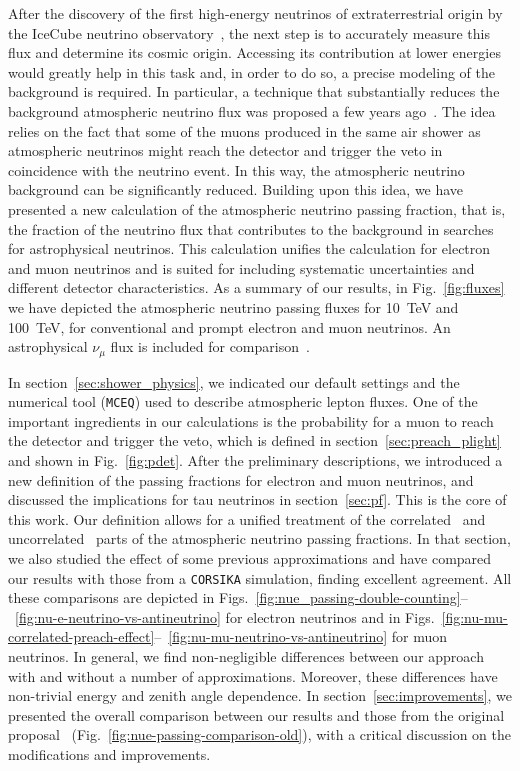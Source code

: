 \documentclass[aps,prd,showpacs,letterpaper,onecolumn,longbibliography,superscriptaddress,notitlepage,nofootinbib]{revtex4-1}%
\newcommand{\MCEq}{\texttt{MCE{\scriptsize Q}}}
\newcommand{\CORSIKA}{\texttt{CORSIKA}}
\begin{document}
After the discovery of the first high-energy neutrinos of extraterrestrial origin by the IceCube neutrino observatory~\cite{Aartsen:2013bka, Aartsen:2013jdh, Aartsen:2014gkd, Aartsen:2015zva, Aartsen:2017mau, Aartsen:2015rwa, Aartsen:2016xlq, Aartsen:2014muf}, the next step is to accurately measure this flux and determine its cosmic origin. Accessing its contribution at lower energies would greatly help in this task and, in order to do so, a precise modeling of the background is required. In particular, a technique that substantially reduces the background atmospheric neutrino flux was proposed a few years ago~\cite{Schonert:2008is, Gaisser:2014bja}. The idea relies on the fact that some of the muons produced in the same air shower as atmospheric neutrinos might reach the detector and trigger the veto in coincidence with the neutrino event. In this way, the atmospheric neutrino background can be significantly reduced. Building upon this idea, we have presented a new calculation of the atmospheric neutrino passing fraction, that is, the fraction of the neutrino flux that contributes to the background in searches for astrophysical neutrinos. This calculation unifies the calculation for electron and muon neutrinos and is suited for including systematic uncertainties and different detector characteristics. As a summary of our results, in Fig.~\ref{fig:fluxes} we have depicted the atmospheric neutrino passing fluxes for 10~TeV and 100~TeV, for conventional and prompt electron and muon neutrinos. An astrophysical $\nu_\mu$ flux is included for comparison~\cite{Aartsen:2017mau}.

In section~\ref{sec:shower_physics}, we indicated our default settings and the numerical tool (\MCEq) used to describe atmospheric lepton fluxes. One of the important ingredients in our calculations is the probability for a muon to reach the detector and trigger the veto, which is defined in section~\ref{sec:preach_plight} and shown in Fig.~\ref{fig:pdet}. After the preliminary descriptions, we introduced a new definition of the passing fractions for electron and muon neutrinos, and discussed the implications for tau neutrinos in section~\ref{sec:pf}. This is the core of this work. Our definition allows for a unified treatment of the correlated~\cite{Schonert:2008is} and uncorrelated~\cite{Gaisser:2014bja} parts of the atmospheric neutrino passing fractions. In that section, we also studied the effect of some previous approximations and have compared our results with those from a \CORSIKA{} simulation, finding excellent agreement. All these comparisons are depicted in Figs.~\ref{fig:nue_passing-double-counting}--~\ref{fig:nu-e-neutrino-vs-antineutrino} for electron neutrinos and in Figs.~\ref{fig:nu-mu-correlated-preach-effect}--~\ref{fig:nu-mu-neutrino-vs-antineutrino} for muon neutrinos. In general, we find non-negligible differences between our approach with and without a number of approximations. Moreover, these differences have non-trivial energy and zenith angle dependence. In section~\ref{sec:improvements}, we presented the overall comparison between our results and those from the original proposal~\cite{Schonert:2008is, Gaisser:2014bja} (Fig.~\ref{fig:nue-passing-comparison-old}), with a critical discussion on the modifications and improvements. 
\end{document}
